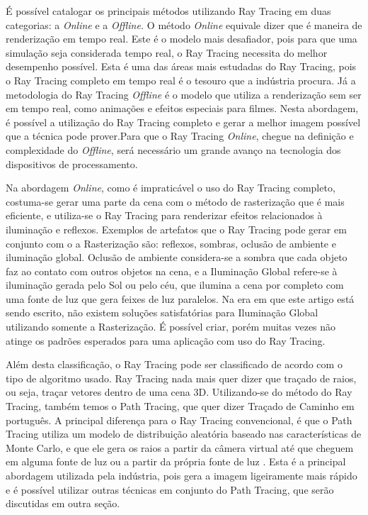 \documentclass[journal]{IEEEtran}
\begin{document}
É possível catalogar os principais métodos utilizando Ray Tracing em duas categorias: 
a \emph{Online} e a \emph{Offline.} O método \emph{Online} equivale dizer que é
maneira de renderização em tempo real. Este é o modelo mais desafiador, pois para
que uma simulação seja considerada tempo real, o Ray Tracing necessita do melhor
desempenho possível. Esta é uma das áreas mais estudadas do Ray Tracing, pois 
o Ray Tracing completo em tempo real é o tesouro que a indústria procura. Já a
metodologia do Ray Tracing \emph{Offline} é o modelo que utiliza a renderização
sem ser em tempo real, como animações e efeitos especiais para filmes. Nesta
abordagem, é possível a utilização do Ray Tracing completo e gerar a melhor imagem
possível que a técnica pode prover.Para que o  Ray Tracing \emph{Online}, chegue na
definição e complexidade do \emph{Offline}, será necessário um grande avanço na 
tecnologia dos dispositivos de processamento.
\cite{c11}

Na abordagem \emph{Online}, como é impraticável o uso do Ray Tracing completo, costuma-se
gerar uma parte da cena com o método de rasterização que é mais eficiente, e utiliza-se
o Ray Tracing para renderizar efeitos relacionados à iluminação e reflexos. Exemplos
de artefatos que o Ray Tracing pode gerar em conjunto com o a Rasterização são:
reflexos, sombras, oclusão de ambiente e iluminação global. Oclusão de ambiente
considera-se a sombra que cada objeto faz ao contato com outros objetos na cena,
e a Iluminação Global refere-se à iluminação gerada pelo Sol ou pelo céu, que
ilumina a cena por completo com uma fonte de luz que gera feixes de luz paralelos.
Na era em que este artigo está sendo escrito, não existem soluções satisfatórias
para Iluminação Global utilizando somente a Rasterização. É possível criar, porém
muitas vezes não atinge os padrões esperados para uma aplicação com uso do 
Ray Tracing.

Além desta classificação, o Ray Tracing pode ser classificado de acordo com o tipo
de algoritmo usado. Ray Tracing nada mais quer dizer que traçado de raios, ou seja,
traçar vetores dentro de uma cena 3D. Utilizando-se do método do Ray Tracing, também
temos o Path Tracing, que quer dizer Traçado de Caminho em português. A principal
diferença para o Ray Tracing convencional, é que o Path Tracing utiliza um modelo
de distribuição aleatória baseado nas características de Monte Carlo, e que ele gera
os raios a partir da câmera virtual até que cheguem em alguma fonte de luz ou a partir 
da própria fonte de luz . Esta é a 
principal abordagem utilizada pela indústria, pois gera a imagem ligeiramente
mais rápido e é possível utilizar outras técnicas em conjunto do Path Tracing,
que serão discutidas em outra seção.
\cite{c4}
\end{document}
